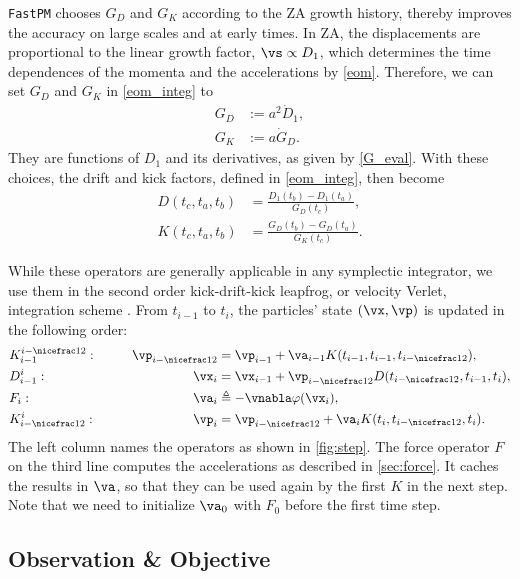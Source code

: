 \documentclass[modern, trackchanges, dvipsnames]{aastex631}
\newcommand{\half}{\nicefrac12}
\begin{document}
\texttt{FastPM} chooses $G_D$ and $G_K$ according to the ZA growth
history, thereby improves the accuracy on large scales and at early
times.
In ZA, the displacements are proportional to the linear growth factor,
$\vs \propto D_1$, which determines the time dependences of the momenta
and the accelerations by \eqref{eom}.
Therefore, we can set $G_D$ and $G_K$ in \eqref{eom_integ} to
%
\begin{align}
G_D &:= a^2 \dot D_1, \nonumber\\
G_K &:= a \dot G_D.
\label{G_ZA}
\end{align}
%
They are functions of $D_1$ and its derivatives, as given by
\eqref{G_eval}.
With these choices, the drift and kick factors, defined in
\eqref{eom_integ}, then become
%
\begin{align}
D(t_c, t_a, t_b) &=
  \frac{D_1(t_b) - D_1(t_a)}{G_D(t_c)}, \nonumber\\
%
K(t_c, t_a, t_b) &=
  \frac{G_D(t_b) - G_D(t_a)}{G_K(t_c)}.
\end{align}
%

While these operators are generally applicable in any symplectic
integrator, we use them in the second order kick-drift-kick leapfrog, or
velocity Verlet, integration scheme \citep{QuinnEtAl1997}.
From $t_{i-1}$ to $t_i$, the particles' state $(\vx, \vp)$ is updated in
the following order:
%
\begin{alignat}{2}
&K_{i-1}^{i-\half}: &\qquad \vp_{i-\half} &= \vp_{i-1}
  + \va_{i-1} K(t_{i-1}, t_{i-1}, t_{i-\half}), \nonumber\\
%
&D_{i-1}^i: & \vx_i &= \vx_{i-1}
  + \vp_{i-\half} D(t_{i-\half}, t_{i-1}, t_i), \nonumber\\
%
&F_i: & \va_i &\triangleq -\vnabla\varphi(\vx_i), \nonumber\\
%
&K_{i-\half}^i: & \vp_i &= \vp_{i-\half}
  + \va_i K(t_i, t_{i-\half}, t_i).
\label{KDFK}
\end{alignat}
%
The left column names the operators as shown in \autoref{fig:step}.
The force operator $F$ on the third line computes the accelerations as
described in \autoref{sec:force}.
It caches the results in $\va$, so that they can be used again by the
first $K$ in the next step.
Note that we need to initialize $\va_0$ with $F_0$ before the first time
step.


\vspace{1em}
\subsection{Observation \& Objective}
\label{sec:obsobj}
\end{document}
